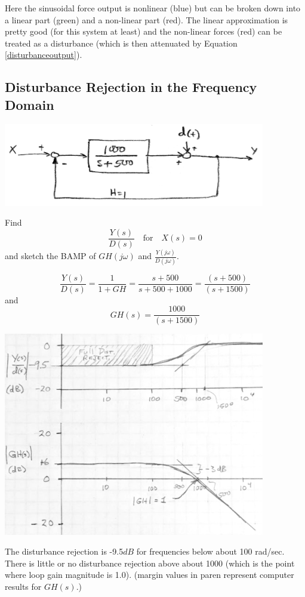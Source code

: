 \begin{Example}
Here the sinusoidal force output is nonlinear (blue) but can be broken down into a linear part (green) and a non-linear part (red). The linear approximation is pretty good (for this system at least) and the non-linear forces (red) can be treated as a disturbance (which is then attenuated by Equation \ref{disturbanceoutput}).

\end{Example}


\subsection{Disturbance Rejection in the Frequency Domain}


\begin{ExampleSmall}

\includegraphics[width=4.5in]{figs06/00774a.png}

Find
\[
\frac{Y(s)}{D(s)} \quad \mathrm{for} \quad  X(s) = 0
\]
and sketch the BAMP of $GH(j\omega)$ and $\frac{Y(j\omega)}{D(j\omega)}$.

\vspace{0.25in}

\[
\frac{Y(s)}{D(s)} = \frac{1}{1+GH} =  \frac  {s+500}  {s+500 + 1000} = \frac{(s+500)}{(s+1500)}
\]
and
\[
GH(s) = \frac{1000}{(s+1500)}
\]


\includegraphics[width=4.5in]{figs06/G64M22.png}


The disturbance rejection is -9.5$dB$ for frequencies below about 100 rad/sec.   There is
little or no disturbance rejection above about 1000 (which is the point where loop gain
magnitude is 1.0). (margin values in paren represent computer results for $GH(s)$.)

\end{ExampleSmall}


